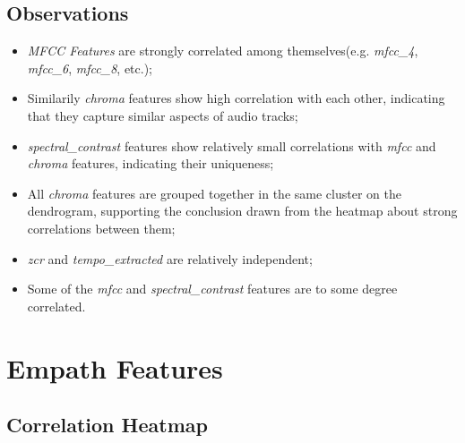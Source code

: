 \subsection*{Observations}
\begin{itemize}
  \item \textit{MFCC Features} are strongly correlated among themselves(e.g.
    \textit{mfcc\_4}, \textit{mfcc\_6}, \textit{mfcc\_8}, etc.);
  \item Similarily \textit{chroma} features show high correlation with each
    other, indicating that they capture similar aspects of audio tracks;
  \item \textit{spectral\_contrast} features show relatively small
    correlations with \textit{mfcc} and  \textit{chroma} features, indicating 
    their uniqueness;
  \item All \textit{chroma} features are grouped together in the same cluster
    on the dendrogram, supporting the conclusion drawn from the heatmap about
    strong correlations between them;
  \item \textit{zcr} and \textit{tempo\_extracted} are relatively independent;
  \item Some of the \textit{mfcc} and \textit{spectral\_contrast} features
    are to some degree correlated.
\end{itemize}



\section{Empath Features}

\subsection*{Correlation Heatmap}
\label{sec:correlationheatmapsspotifyfeatures}

